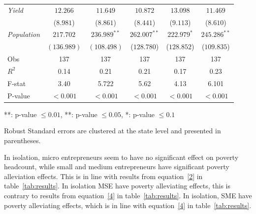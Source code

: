 \documentclass [12pt]{article}
\begin{document}
\begin{table}[htbp]
\begin{threeparttable}
\begin{tabular}{lccccc}
            \textit{Yield}  & $12.266$  & $11.649$  & $10.872$  & $13.098$ & $11.469$  \\
                            & ($ 8.981$)  & ($8.861$)  & ($8.441$)  & ($9.113$)  & ($ 8.610$)  \\
            \textit{Population} & $217.702$  & $236.989^{**}$ &  $262.007^{**}$&$222.979^{*}$ & $245.286^{**}$\\
                                & $(136.989)$ & $(108.498)$ & ($128.780$) &  ($128.852$) &  ($109.835$)\\
            \bottomrule
            Obs & 137 & 137 & 137 & 137 & 137 \\
            $R^{2}$ & 0.14 & 0.21  & 0.21 & 0.17  & 0.23  \\
            F-stat & 3.40     &  5.722  & 5.62  & 4.13  & 6.101  \\
            P-value & $< 0.001$ & $< 0.001$ & $< 0.001$ & $< 0.001$ & $< 0.001$ \\
            \bottomrule
            \bottomrule
        \end{tabular}
        \begin{tablenotes}[flushleft] 
            \smaller
            \item ***: p-value $\leq 0.01$, **: p-value $\leq 0.05$, *: p-value $\leq 0.1$
            \vspace{0.1cm}
            \item Robust Standard errors are clustered at the state level and presented in parentheses.
        \end{tablenotes}
    \end{threeparttable}
    \label{tab:results_extended}
\end{table}


\text In isolation, micro entrepreneurs seem to have no significant effect on poverty headcount, while small and medium entrepreneurs have significant poverty alleviation effects. This is in line with results from equation~\ref{2} in table~\ref{tab:results}. In isolation MSE have poverty alleviating effects, this is contrary to results from equation~\ref{4} in table~\ref{tab:results}. In isolation, SME have poverty alleviating effects, which is in line with equation~\ref{4} in table~\ref{tab:results}.

\newpage
\end{document}
